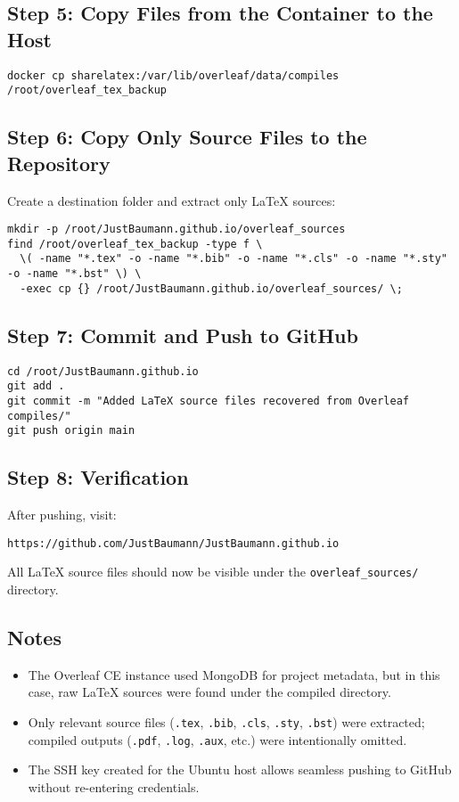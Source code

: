 \subsection{Step 5: Copy Files from the Container to the Host}
\begin{verbatim}
docker cp sharelatex:/var/lib/overleaf/data/compiles /root/overleaf_tex_backup
\end{verbatim}

\subsection{Step 6: Copy Only Source Files to the Repository}
Create a destination folder and extract only \LaTeX{} sources:
\begin{verbatim}
mkdir -p /root/JustBaumann.github.io/overleaf_sources
find /root/overleaf_tex_backup -type f \
  \( -name "*.tex" -o -name "*.bib" -o -name "*.cls" -o -name "*.sty" -o -name "*.bst" \) \
  -exec cp {} /root/JustBaumann.github.io/overleaf_sources/ \;
\end{verbatim}

\subsection{Step 7: Commit and Push to GitHub}
\begin{verbatim}
cd /root/JustBaumann.github.io
git add .
git commit -m "Added LaTeX source files recovered from Overleaf compiles/"
git push origin main
\end{verbatim}

\subsection{Step 8: Verification}
After pushing, visit:
\begin{center}
\texttt{https://github.com/JustBaumann/JustBaumann.github.io}
\end{center}
All \LaTeX{} source files should now be visible under the \texttt{overleaf\_sources/} directory.

\subsection{Notes}
\begin{itemize}
  \item The Overleaf CE instance used MongoDB for project metadata, but in this case, raw \LaTeX{} sources were found under the compiled directory.
  \item Only relevant source files (\texttt{.tex}, \texttt{.bib}, \texttt{.cls}, \texttt{.sty}, \texttt{.bst}) were extracted; compiled outputs (\texttt{.pdf}, \texttt{.log}, \texttt{.aux}, etc.) were intentionally omitted.
  \item The SSH key created for the Ubuntu host allows seamless pushing to GitHub without re-entering credentials.
\end{itemize}
